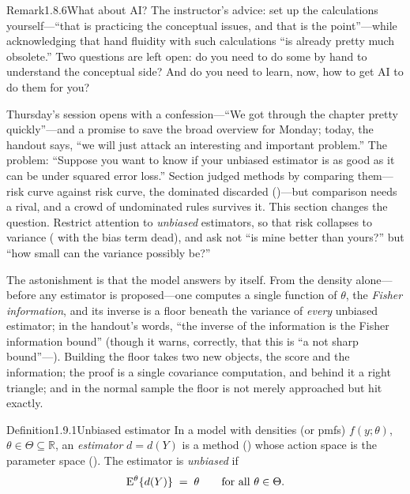 \documentclass[main.tex]{subfiles}
\begin{document}
\begin{ObjL}{Remark}{1.8.6}{What about AI?}
The instructor's advice: set up the calculations yourself---``that is practicing the conceptual
issues, and that is the point''---while acknowledging that hand fluidity with such calculations
``is already pretty much obsolete.'' Two questions are left open: do you need to do some by
hand to understand the conceptual side? And do you need to learn, now, how to get AI to do them
for you?
\end{ObjL}


Thursday's session opens with a confession---``We got through the chapter pretty
quickly''---and a promise to save the broad overview for Monday; today, the handout says, ``we
will just attack an interesting and important problem.'' The problem: ``Suppose you want to
know if your unbiased estimator is as good as it can be under squared error loss.'' Section
 judged methods by comparing them---risk curve against risk curve, the dominated
discarded ()---but comparison needs a rival, and a crowd of undominated rules
survives it. This section changes the question. Restrict attention to \emph{unbiased}
estimators, so that risk collapses to variance ( with the bias term dead), and ask
not ``is mine better than yours?'' but ``how small can the variance possibly be?''

The astonishment is that the model answers by itself. From the density alone---before any
estimator is proposed---one computes a single function of $\theta$, the \emph{Fisher
information}, and its inverse is a floor beneath the variance of \emph{every} unbiased
estimator; in the handout's words, ``the inverse of the information is the Fisher information
bound'' (though it warns, correctly, that this is ``a not sharp bound''---).
Building the floor takes two new objects, the score and the information; the proof is a single
covariance computation, and behind it a right triangle; and in the normal sample the floor is
not merely approached but hit exactly. 

\begin{Obj}{Definition}{1.9.1}{Unbiased estimator}
In a model with densities (or pmfs) $f(y;\theta)$, $\theta\in\Theta\subseteq\mathbb{R}$, an
\emph{estimator} $d=d(Y)$ is a method () whose action space is the parameter
space (). The estimator is \emph{unbiased} if
\[ \mathrm{E}^{\theta}\{d(Y)\} \;=\; \theta \qquad\text{for all } \theta\in\Theta . \]
\end{Obj}
\end{document}

